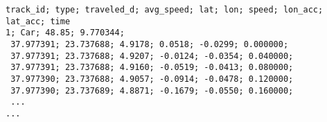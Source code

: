 \begin{verbatim}track_id; type; traveled_d; avg_speed; lat; lon; speed; lon_acc; lat_acc; time
1; Car; 48.85; 9.770344;
 37.977391; 23.737688; 4.9178; 0.0518; -0.0299; 0.000000;
 37.977391; 23.737688; 4.9207; -0.0124; -0.0354; 0.040000;
 37.977391; 23.737688; 4.9160; -0.0519; -0.0413; 0.080000;
 37.977390; 23.737688; 4.9057; -0.0914; -0.0478; 0.120000;
 37.977390; 23.737689; 4.8871; -0.1679; -0.0550; 0.160000;
 ...
...\end{verbatim}